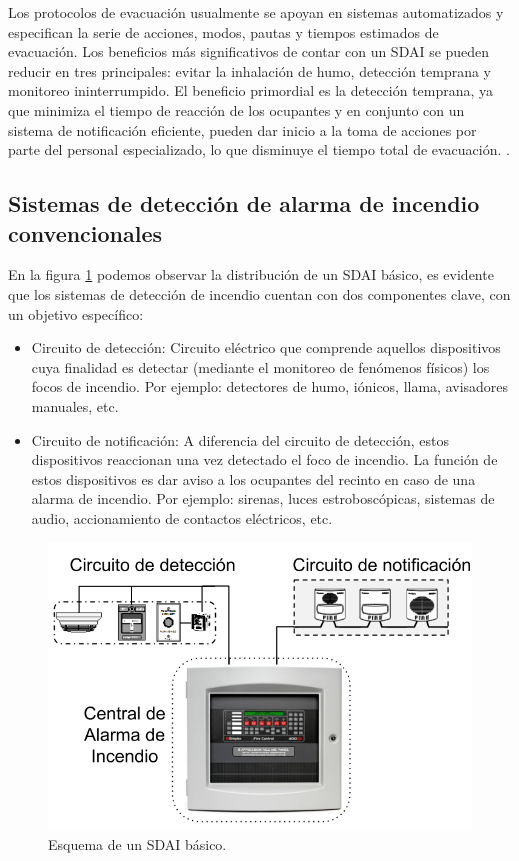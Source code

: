 Los protocolos de evacuación usualmente se apoyan en sistemas automatizados y especifican la serie de acciones, modos, pautas y tiempos estimados de evacuación. Los beneficios más significativos de contar con un SDAI se pueden reducir en tres principales: evitar la inhalación de humo, detección temprana y monitoreo ininterrumpido. El beneficio primordial es la detección temprana, ya que minimiza el tiempo de reacción de los ocupantes y en conjunto con un sistema de notificación eficiente, pueden dar inicio a la toma de acciones por parte del personal especializado, lo que disminuye el tiempo total de evacuación. \citep{utn_1}\citep{plan_evac}.
 
\subsection{Sistemas de detección de alarma de incendio convencionales}
%

En la figura \ref{fig:sdai_conv} podemos observar la distribución de un SDAI básico, es evidente que los sistemas de detección de incendio cuentan con dos componentes clave, con un objetivo específico:
\begin{itemize}
\item Circuito de detección: Circuito eléctrico que comprende aquellos dispositivos cuya finalidad es detectar (mediante el monitoreo de fenómenos físicos) los focos de incendio. Por ejemplo: detectores de humo, iónicos, llama, avisadores manuales, etc.
\item Circuito de notificación: A diferencia del circuito de detección, estos dispositivos reaccionan una vez detectado el foco de incendio. La función de estos dispositivos es dar aviso a los ocupantes del recinto en caso de una alarma de incendio. Por ejemplo: sirenas, luces estroboscópicas, sistemas de audio, accionamiento de contactos eléctricos, etc. 
\end{itemize}
\begin{figure}[ht]
	\centering
	\includegraphics[scale=.45]{./Figures/sdai_conv.png}
	\caption{Esquema de un SDAI básico.}
	\label{fig:sdai_conv}
\end{figure}

